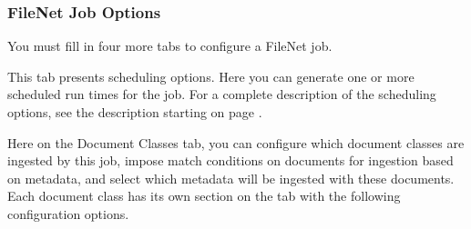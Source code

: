 %
%

\subsubsection{FileNet Job Options}

You must fill in four more tabs to configure a FileNet job.


\ifJDBCGuide

\fi

\ifCombinedConnectorGuide
This tab presents scheduling options. Here you can generate one or
more scheduled run times for the job. For a complete description of
the scheduling options, see the description starting on page
\pageref{scheduling}.
\fi


Here on the Document Classes tab, you can configure which document
classes are ingested by this job, impose match conditions on documents
for ingestion based on metadata, and select which metadata will be
ingested with these documents. Each document class has its own section
on the tab with the following configuration options.

